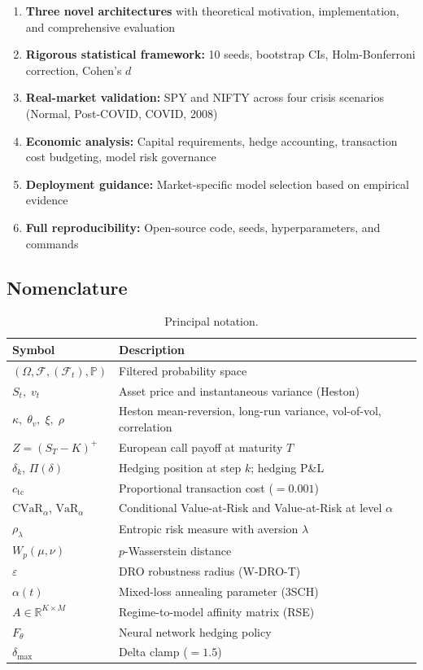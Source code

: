 \documentclass[11pt]{article}
\newcommand{\R}{\mathbb{R}}
\newcommand{\F}{\mathcal{F}}
\newcommand{\PP}{\mathbb{P}}
\newcommand{\cvar}{\mathrm{CVaR}}
\newcommand{\VaR}{\mathrm{VaR}}
\begin{document}
\begin{enumerate}[noitemsep,leftmargin=*]
    \item \textbf{Three novel architectures} with theoretical motivation, implementation, and comprehensive evaluation
    \item \textbf{Rigorous statistical framework:} 10 seeds, bootstrap CIs, Holm-Bonferroni correction, Cohen's $d$
    \item \textbf{Real-market validation:} SPY and NIFTY across four crisis scenarios (Normal, Post-COVID, COVID, 2008)
    \item \textbf{Economic analysis:} Capital requirements, hedge accounting, transaction cost budgeting, model risk governance
    \item \textbf{Deployment guidance:} Market-specific model selection based on empirical evidence
    \item \textbf{Full reproducibility:} Open-source code, seeds, hyperparameters, and commands
\end{enumerate}

\subsection{Nomenclature}

\begin{table}[h]
\centering
\caption{Principal notation.}
\label{tab:nomenclature}
\small
\begin{tabularx}{\textwidth}{@{}lX@{}}
\toprule
\textbf{Symbol} & \textbf{Description} \\
\midrule
$(\Omega,\F,(\F_t),\PP)$ & Filtered probability space \\
$S_t,\; v_t$ & Asset price and instantaneous variance (Heston) \\
$\kappa,\;\theta_v,\;\xi,\;\rho$ & Heston mean-reversion, long-run variance, vol-of-vol, correlation \\
$Z = (S_T-K)^+$ & European call payoff at maturity $T$ \\
$\delta_k$, $\Pi(\delta)$ & Hedging position at step $k$; hedging P\&L \\
$c_{\mathrm{tc}}$ & Proportional transaction cost ($= 0.001$) \\
$\cvar_\alpha$, $\VaR_\alpha$ & Conditional Value-at-Risk and Value-at-Risk at level $\alpha$ \\
$\rho_\lambda$ & Entropic risk measure with aversion $\lambda$ \\
$W_p(\mu,\nu)$ & $p$-Wasserstein distance \\
$\varepsilon$ & DRO robustness radius (W-DRO-T) \\
$\alpha(t)$ & Mixed-loss annealing parameter (3SCH) \\
$A \in \R^{K \times M}$ & Regime-to-model affinity matrix (RSE) \\
$F_\theta$ & Neural network hedging policy \\
$\delta_{\max}$ & Delta clamp ($= 1.5$) \\
\bottomrule
\end{tabularx}
\end{table}
\end{document}
